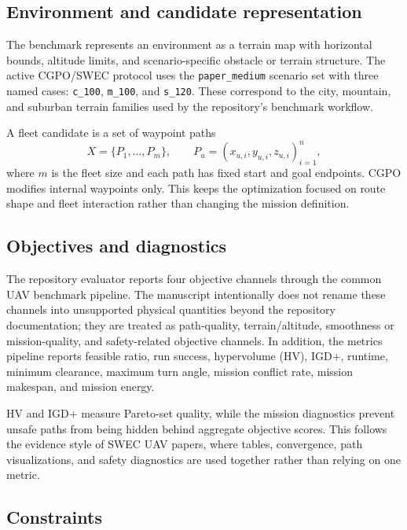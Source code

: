 \documentclass[a4paper,fleqn]{cas-dc}
\begin{document}
\subsection{Environment and candidate representation}

The benchmark represents an environment as a terrain map with horizontal bounds, altitude limits, and scenario-specific obstacle or terrain structure. The active CGPO/SWEC protocol uses the \texttt{paper\_medium} scenario set with three named cases: \texttt{c\_100}, \texttt{m\_100}, and \texttt{s\_120}. These correspond to the city, mountain, and suburban terrain families used by the repository's benchmark workflow.

A fleet candidate is a set of waypoint paths
\begin{equation}
X=\{P_1,\ldots,P_m\}, \qquad
P_u=(x_{u,i},y_{u,i},z_{u,i})_{i=1}^{n},
\end{equation}
where $m$ is the fleet size and each path has fixed start and goal endpoints. CGPO modifies internal waypoints only. This keeps the optimization focused on route shape and fleet interaction rather than changing the mission definition.

\subsection{Objectives and diagnostics}

The repository evaluator reports four objective channels through the common UAV benchmark pipeline. The manuscript intentionally does not rename these channels into unsupported physical quantities beyond the repository documentation; they are treated as path-quality, terrain/altitude, smoothness or mission-quality, and safety-related objective channels. In addition, the metrics pipeline reports feasible ratio, run success, hypervolume (HV), IGD+, runtime, minimum clearance, maximum turn angle, mission conflict rate, mission makespan, and mission energy.

HV and IGD+ measure Pareto-set quality, while the mission diagnostics prevent unsafe paths from being hidden behind aggregate objective scores. This follows the evidence style of SWEC UAV papers, where tables, convergence, path visualizations, and safety diagnostics are used together rather than relying on one metric.

\subsection{Constraints}
\end{document}
